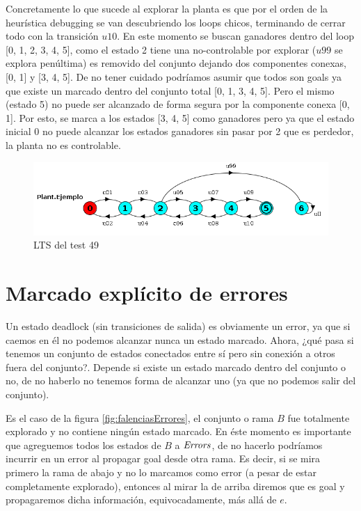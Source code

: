 Concretamente lo que sucede al explorar la planta es que por el orden de la heurística debugging se van descubriendo los loops chicos, terminando de cerrar todo con la transición $u10$. En este momento se buscan ganadores dentro del loop [0, 1, 2, 3, 4, 5], como el estado 2 tiene una no-controlable por explorar ($u99$ se explora penúltima) es removido del conjunto dejando dos componentes conexas, [0, 1] y [3, 4, 5]. De no tener cuidado podríamos asumir que todos son goals ya que existe un marcado dentro del conjunto total [0, 1, 3, 4, 5]. Pero el mismo (estado 5) no puede ser alcanzado de forma segura por la componente conexa [0, 1]. Por esto, se marca a los estados [3, 4, 5] como ganadores pero ya que el estado inicial 0 no puede alcanzar los estados ganadores sin pasar por 2 que es perdedor, la planta no es controlable.
\begin{figure}[h]
 \centering
 \includegraphics[scale=0.7]{figures/tests/test49.png}
 \caption{LTS del test 49}
 \label{fig:test49}
\end{figure}



\section{Marcado explícito de errores}\label{marcarErrores}

Un estado deadlock (sin transiciones de salida) es obviamente un error, ya que si caemos en él no podemos alcanzar nunca un estado marcado. Ahora, ¿qué pasa si tenemos un conjunto de estados conectados entre sí pero sin conexión a otros fuera del conjunto?. Depende si existe un estado marcado dentro del conjunto o no, de no haberlo no tenemos forma de alcanzar uno (ya que no podemos salir del conjunto). 

Es el caso de la figura \ref{fig:falenciasErrores}, el conjunto o rama $B$ fue totalmente explorado y no contiene ningún estado marcado. En éste momento es importante que agreguemos todos los estados de $B$ a $\mathit{Errors}$, de no hacerlo podríamos incurrir en un error al propagar goal desde otra rama. Es decir, si se mira primero la rama de abajo y no lo marcamos como error (a pesar de estar completamente explorado), entonces al mirar la de arriba diremos que es goal y propagaremos dicha información, equivocadamente, más allá de $e$. 

